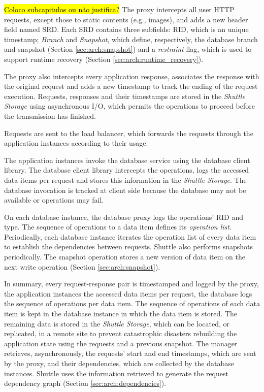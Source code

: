 \hl{Coloco subcapitulos ou não justifica?}
The proxy intercepts all user \ac{HTTP} requests, except those to static contents (e.g., images), and adds a new header field named \acf{SRD}. Each \ac{SRD} contains three subfields: \acf{RID}, which is an unique timestamp; \emph{Branch} and \emph{Snapshot}, which define, respectively, the database branch and snapshot (Section \ref{sec:arch:snapshot}) and a \emph{restraint} flag, which is used to support runtime recovery (Section \ref{sec:arch:runtime_recovery}). 

The proxy also intercepts every application response, associates the response with the original request and adds a new timestamp to track the ending of the request execution. Requests, responses and their timestamps are stored in the \emph{Shuttle Storage} using asynchronous I/O, which permits the operations to proceed before the transmission has finished. 

Requests are sent to the load balancer, which forwards the requests through the application instances according to their usage.


The application instances invoke the database service using the database client library. The database client library intercepts the operations, logs the accessed data items per request and stores this information in the \emph{Shuttle Storage}. The database invocation is tracked at client side because the database may not be available or operations may fail.

On each database instance, the database proxy logs the operations' \ac{RID} and type. The sequence of operations to a data item defines its \emph{operation list}. Periodically, each database instance iterates the operation list of every data item to establish the dependencies between requests. Shuttle also performs snapshots periodically. The snapshot operation stores a new version of data item on the next write operation (Section \ref{sec:arch:snapshot}).


In summary, every request-response pair is timestamped and logged by the proxy, the application instances the accessed data items per request, the database logs the sequence of operations per data item. The sequence of operations of each data item is kept in the database instance in which the data item is stored. The remaining data is stored in the \emph{Shuttle Storage}, which can be located, or replicated, in a remote site to prevent catastrophic disasters rebuilding the application state using the requests and a previous snapshot. The manager retrieves, asynchronously, the requests' start and end timestamps, which are sent by the proxy, and their dependencies, which are collected by the database instances. Shuttle uses the information retrieved to generate the request dependency graph (Section \ref{sec:arch:dependencies}).






